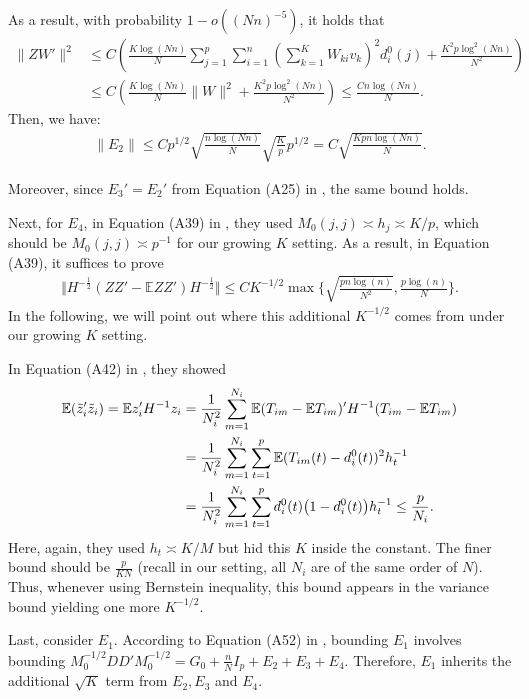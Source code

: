 \documentclass[preprint,11pt]{article}
\numberwithin{equation}{section}
\begin{document}
As a result, with probability $1-o((Nn)^{-5})$, it holds that
\begin{align*}
    \|ZW'\|^2&\le C\left(\frac{K\log(Nn)}{N}\sum_{j=1}^p\sum_{i=1}^n\left(\sum_{k=1}^KW_{ki}v_k\right)^2d_i^0(j)+\frac{K^2p\log^2(Nn)}{N^2}\right)\\
    &\le C\left(\frac{K\log(Nn)}{N}\|W\|^2+\frac{K^2p\log^2(Nn)}{N^2}\right)\le \frac{Cn\log(Nn)}{N}.
\end{align*}
Then, we have:
\begin{align*}
    \|E_2\|\le Cp^{1/2}\sqrt{\frac{n\log(Nn)}{N}}\sqrt{\frac{K}{p}}p^{1/2} = C\sqrt{\frac{Kpn\log(Nn)}{N}}.
\end{align*}

Moreover, since $E_3'=E_2'$ from Equation (A25) in \cite{ke2024entry}, the same bound holds.

Next, for $E_4$, in Equation (A39) in \cite{ke2024entry}, they used $M_0(j,j)\asymp h_j\asymp K/p$, which should be $M_0(j,j)\asymp p^{-1}$ for our growing $K$ setting. As a result, in Equation (A39), it suffices to prove
\begin{align}\label{bd:new2}
 \Vert H^{-\frac 12} (ZZ'- \mathbb{E} ZZ') H^{-\frac 12} \Vert
  \leq CK^{-1/2} \max\Big\{ \sqrt{\frac{pn\log (n)}{N^2}}, \frac{p\log (n)}{N}\Big\}. 
\end{align}
In the following, we will point out where this additional $K^{-1/2}$ comes from under our growing $K$ setting.

In Equation (A42) in \cite{ke2024entry}, they showed
\begin{align*}
 \mathbb{E} ( \tilde{z}_i' \tilde{z}_i)= \mathbb{E} z_i' H^{-1} z_i &=\frac{1}{N_i^2} \sum_{m=1}^{N_i} \mathbb{E} (T_{im}- \mathbb{E} T_{im})' H^{-1} (T_{im}- \mathbb{E} T_{im}) \notag\\
 &= \frac{1}{N_i^2} \sum_{m=1}^{N_i}\sum_{t=1}^p \mathbb{E}(T_{im}(t)- d_i^0(t))^2 h_t^{-1}\notag\\
 &=  \frac{1}{N_i^2} \sum_{m=1}^{N_i} \sum_{t=1}^p d_i^0(t)\big(1 - d_i^0(t)\big)h_t^{-1}\leq \frac{p}{N_i}.
 \end{align*}
 Here, again, they used $h_t\asymp K/M$ but hid this $K$ inside the constant. The finer bound should be $\frac{p}{KN}$ (recall in our setting, all $N_i$ are of the same order of $N$). Thus, whenever using Bernstein inequality, this bound appears in the variance bound yielding one more $K^{-1/2}$.

 Last, consider $E_1$. According to Equation (A52) in \cite{ke2024entry}, bounding $E_1$ involves bounding $M_0^{-1/2}DD'M_0^{-1/2}=G_0+\frac{n}{N}I_p+E_2+E_3+E_4$. Therefore, $E_1$ inherits the additional $\sqrt{K}$ term from $E_2,E_3$ and $E_4$.
\end{document}
